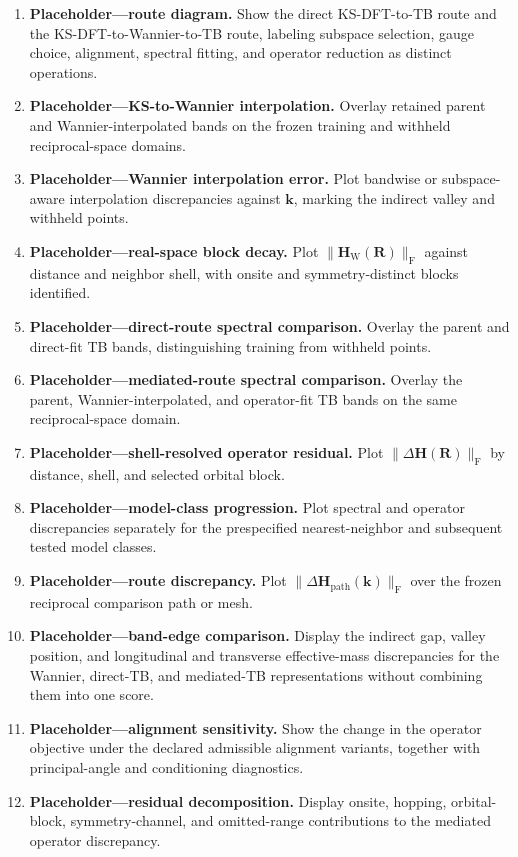 \begin{enumerate}
    \item \textbf{Placeholder---route diagram.} Show the direct
          KS-DFT-to-TB route and the KS-DFT-to-Wannier-to-TB route, labeling
          subspace selection, gauge choice, alignment, spectral fitting, and
          operator reduction as distinct operations.
    \item \textbf{Placeholder---KS-to-Wannier interpolation.} Overlay retained
          parent and Wannier-interpolated bands on the frozen training and
          withheld reciprocal-space domains.
    \item \textbf{Placeholder---Wannier interpolation error.} Plot bandwise or
          subspace-aware interpolation discrepancies against $\mathbf k$,
          marking the indirect valley and withheld points.
    \item \textbf{Placeholder---real-space block decay.} Plot
          $\lVert\mathbf H_{\mathrm W}(\mathbf R)\rVert_{\mathrm F}$ against
          distance and neighbor shell, with onsite and symmetry-distinct blocks
          identified.
    \item \textbf{Placeholder---direct-route spectral comparison.} Overlay the
          parent and direct-fit TB bands, distinguishing training from withheld
          points.
    \item \textbf{Placeholder---mediated-route spectral comparison.} Overlay
          the parent, Wannier-interpolated, and operator-fit TB bands on the
          same reciprocal-space domain.
    \item \textbf{Placeholder---shell-resolved operator residual.} Plot
          $\lVert\Delta\mathbf H(\mathbf R)\rVert_{\mathrm F}$ by distance,
          shell, and selected orbital block.
    \item \textbf{Placeholder---model-class progression.} Plot spectral and
          operator discrepancies separately for the prespecified
          nearest-neighbor and subsequent tested model classes.
    \item \textbf{Placeholder---route discrepancy.} Plot
          $\lVert\Delta\mathbf H_{\mathrm{path}}(\mathbf k)\rVert_{\mathrm F}$
          over the frozen reciprocal comparison path or mesh.
    \item \textbf{Placeholder---band-edge comparison.} Display the indirect
          gap, valley position, and longitudinal and transverse effective-mass
          discrepancies for the Wannier, direct-TB, and mediated-TB
          representations without combining them into one score.
    \item \textbf{Placeholder---alignment sensitivity.} Show the change in the
          operator objective under the declared admissible alignment variants,
          together with principal-angle and conditioning diagnostics.
    \item \textbf{Placeholder---residual decomposition.} Display onsite,
          hopping, orbital-block, symmetry-channel, and omitted-range
          contributions to the mediated operator discrepancy.
\end{enumerate}
